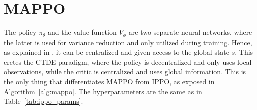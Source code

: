 \begin{table}[t]
\caption{IPPO parameters\label{tab:ippo_params}}\vspace{0.25em} %
%
\end{table}

\section{MAPPO}

The policy $\pi_{\theta}$ and the value function $V_{\phi}$ are two separate neural networks, where the latter is used for variance reduction and only utilized during training. 
Hence, as explained in \cite{yu2022mappo}, it can be centralized and given access to the global state $s$. This cretes the CTDE paradigm, where the policy is decentralized and only uses local observations, while the critic is centralized and uses global information.
This is the only thing that differentiates MAPPO from IPPO, as exposed in Algorithm~\ref{alg:mappo}. The hyperparameters are the same as in Table~\ref{tab:ippo_params}.

